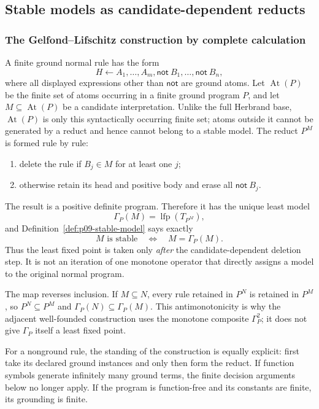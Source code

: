 
\subsection{Stable models as candidate-dependent reducts}
\label{sec:p09-presentation-n-c-023}

\subsubsection{The Gelfond--Lifschitz construction by complete calculation}

A finite ground normal rule has the form
\[
 H\leftarrow A_1,\ldots,A_m,
   \mathsf{not}\ B_1,\ldots,\mathsf{not}\ B_n,
\]
where all displayed expressions other than \(\mathsf{not}\) are ground atoms.
Let \(\operatorname{At}(P)\) be the finite set of atoms occurring in a finite
ground program \(P\), and let \(M\subseteq\operatorname{At}(P)\) be a candidate
interpretation.  Unlike the full Herbrand base, \(\operatorname{At}(P)\) is only
this syntactically occurring finite set; atoms outside it cannot be generated by
a reduct and hence cannot belong to a stable model.  The reduct \(P^M\) is
formed rule by rule:
\begin{enumerate}
\item delete the rule if \(B_j\in M\) for at least one \(j\);
\item otherwise retain its head and positive body and erase all
  \(\mathsf{not}\ B_j\).
\end{enumerate}
The result is a positive definite program.  Therefore it has the unique least
model
\[
 \Gamma_P(M)=\operatorname{lfp}(T_{P^M}),
\]
and Definition~\ref{def:p09-stable-model} says exactly
\[
 M\text{ is stable}
 \quad\Longleftrightarrow\quad
 M=\Gamma_P(M).
\]
Thus the least fixed point is taken only \emph{after} the candidate-dependent
deletion step.  It is not an iteration of one monotone operator that directly
assigns a model to the original normal program.

The map reverses inclusion.  If \(M\subseteq N\), every rule retained in
\(P^N\) is retained in \(P^M\), so \(P^N\subseteq P^M\) and
\(\Gamma_P(N)\subseteq\Gamma_P(M)\).  This antimonotonicity is why the adjacent
well-founded construction uses the monotone composite \(\Gamma_P^2\); it does
not give \(\Gamma_P\) itself a least fixed point.

For a nonground rule, the standing of the construction is equally explicit:
first take its declared ground instances and only then form the reduct.  If
function symbols generate infinitely many ground terms, the finite decision
arguments below no longer apply.  If the program is function-free and its
constants are finite, its grounding is finite.

